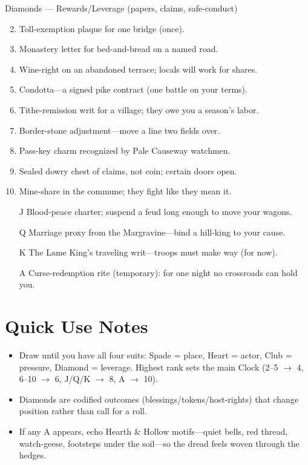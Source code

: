 Diamonds --- Rewards/Leverage (papers, claims, safe-conduct)
\begin{enumerate}
\setcounter{enumi}{1}
\item Toll-exemption plaque for one bridge (once).
\item Monastery letter for bed-and-bread on a named road.
\item Wine-right on an abandoned terrace; locals will work for shares.
\item Condotta---a signed pike contract (one battle on your terms).
\item Tithe-remission writ for a village; they owe you a season's labor.
\item Border-stone adjustment---move a line two fields over.
\item Pass-key charm recognized by Pale Causeway watchmen.
\item Sealed dowry chest of claims, not coin; certain doors open.
\item Mine-share in the commune; they fight like they mean it.
\item[J] Blood-peace charter; suspend a feud long enough to move your wagons.
\item[Q] Marriage proxy from the Margravine---bind a hill-king to your cause.
\item[K] The Lame King's traveling writ---troops must make way (for now).
\item[A] Curse-redemption rite (temporary): for one night no crossroads can hold you.
\end{enumerate}

\section*{Quick Use Notes}
\label{sec:acasia-quick-use}
\begin{itemize}
\item Draw until you have all four suits: Spade = place, Heart = actor, Club = pressure, Diamond = leverage. Highest rank sets the main Clock (2--5 $\rightarrow$ 4, 6--10 $\rightarrow$ 6, J/Q/K $\rightarrow$ 8, A $\rightarrow$ 10).
\item Diamonds are codified outcomes (blessings/tokens/host-rights) that change position rather than call for a roll.
\item If any A appears, echo Hearth \& Hollow motifs---quiet bells, red thread, watch-geese, footsteps under the soil---so the dread feels woven through the hedges.
\end{itemize}

